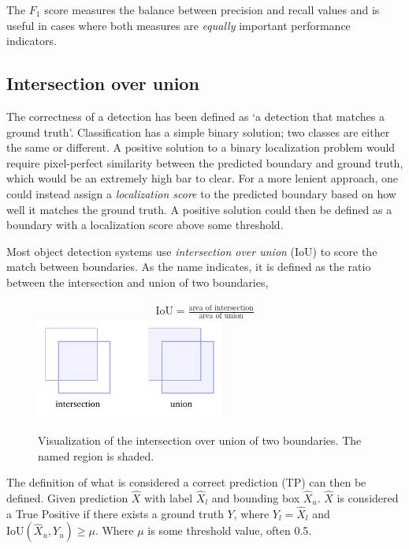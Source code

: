 The \(F_1\) score measures the balance between precision and recall values and is useful in cases where both measures are \textit{equally} important performance indicators.

\subsection{Intersection over union}
The correctness of a detection has been defined as `a detection that matches a ground truth'.
Classification has a simple binary solution; two classes are either the same or different.
A positive solution to a binary localization problem would require pixel-perfect similarity between the predicted boundary and ground truth, which would be an extremely high bar to clear.
For a more lenient approach, one could instead assign a \textit{localization score} to the predicted boundary based on how well it matches the ground truth.
A positive solution could then be defined as a boundary with a localization score above some threshold.

Most object detection systems use \textit{intersection over union} (IoU) to score the match between boundaries.
As the name indicates, it is defined as the ratio between the intersection and union of two boundaries,

\begin{figure}[htb]
  \centering
  \begin{gather*}
    \text{IoU}=\frac{\text{area of intersection}}{\text{area of union}}
  \end{gather*}
  \includegraphics[width=0.55\textwidth]{figs/background/iou.pdf}
\caption[Intersection over union]{Visualization of the intersection over union of two boundaries.
The named region is shaded.}\label{fig:iou}
\end{figure}

The definition of what is considered a correct prediction (TP) can then be defined.
Given prediction \(\hat{X}\) with label \(\hat{X}_l\) and bounding box \(\hat{X}_u\). \(\hat{X}\) is considered a True Positive if there exists a ground truth \(Y\), where \(Y_{l}=\hat{X}_l\) and \(\text{IoU}(\hat{X}_u, Y_{u})\ge \mu \).
Where \( \mu \) is some threshold value, often 0.5.

